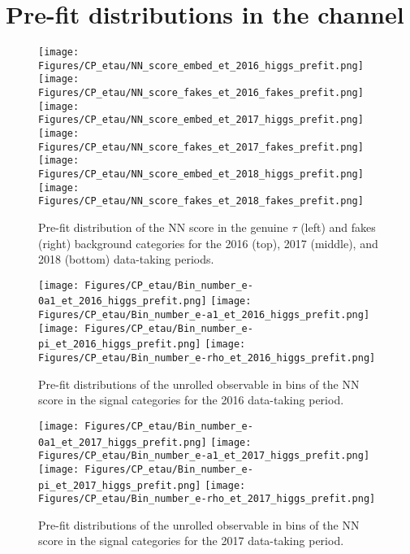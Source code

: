 \newpage
\section{Pre-fit distributions in the \et channel}\label{app:pre-fit}

\begin{figure}[H]
    \centering
    \texttt{[image: Figures/CP\_etau/NN\_score\_embed\_et\_2016\_higgs\_prefit.png]}
    \texttt{[image: Figures/CP\_etau/NN\_score\_fakes\_et\_2016\_fakes\_prefit.png]}
    \texttt{[image: Figures/CP\_etau/NN\_score\_embed\_et\_2017\_higgs\_prefit.png]}
    \texttt{[image: Figures/CP\_etau/NN\_score\_fakes\_et\_2017\_fakes\_prefit.png]}
    \texttt{[image: Figures/CP\_etau/NN\_score\_embed\_et\_2018\_higgs\_prefit.png]}
    \texttt{[image: Figures/CP\_etau/NN\_score\_fakes\_et\_2018\_fakes\_prefit.png]}
    \caption{Pre-fit distribution of the NN score in the genuine $\tau$ (left) and fakes (right) background categories for the 2016 (top), 2017 (middle), and 2018 (bottom) data-taking periods.}
\end{figure}

\begin{figure}[H]
    \centering
    \texttt{[image: Figures/CP\_etau/Bin\_number\_e-0a1\_et\_2016\_higgs\_prefit.png]}
    \texttt{[image: Figures/CP\_etau/Bin\_number\_e-a1\_et\_2016\_higgs\_prefit.png]}
    \texttt{[image: Figures/CP\_etau/Bin\_number\_e-pi\_et\_2016\_higgs\_prefit.png]}
    \texttt{[image: Figures/CP\_etau/Bin\_number\_e-rho\_et\_2016\_higgs\_prefit.png]}
    \caption{Pre-fit distributions of the unrolled \phicp observable in bins of the NN score in the signal categories for the 2016 data-taking period.}
\end{figure}

\begin{figure}[H]
    \centering
    \texttt{[image: Figures/CP\_etau/Bin\_number\_e-0a1\_et\_2017\_higgs\_prefit.png]}
    \texttt{[image: Figures/CP\_etau/Bin\_number\_e-a1\_et\_2017\_higgs\_prefit.png]}
    \texttt{[image: Figures/CP\_etau/Bin\_number\_e-pi\_et\_2017\_higgs\_prefit.png]}
    \texttt{[image: Figures/CP\_etau/Bin\_number\_e-rho\_et\_2017\_higgs\_prefit.png]}
    \caption{Pre-fit distributions of the unrolled \phicp observable in bins of the NN score in the signal categories for the 2017 data-taking period.}
\end{figure}

